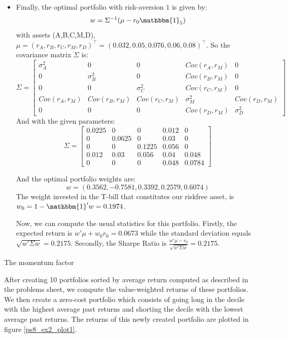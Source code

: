 \documentclass[10pt]{article}
\newenvironment{exercise}[2][Exercise]{\begin{trivlist}
  \item[\hskip \labelsep {\bfseries #1}\hskip \labelsep {\bfseries #2.}]}{\end{trivlist}}
\begin{document}
\begin{itemize}
  In addition, the Information Ratio is the ratio $IR = \frac{\alpha_D}{\sigma_D} =\frac{0.012}{0.08}= 0.15$
  \item[(d)] Finally, the optimal portfolio with risk-aversion $1$ is given by:
  $$ w = \Sigma^{-1}(\mu-r_0\mathbbm{1}_5)$$ with assets (A,B,C,M,D), $\mu = (r_A,r_B,r_C,r_M,r_D)^\top = (0.032,0.05,0.076,0.06,0.08)^\top$. So the covariance matrix $\Sigma$ is: 
  $$ \Sigma = \left[\begin{array}{ccccc}
    \sigma_A^2& 0 &0 &Cov(r_A,r_M)& 0\\
    0&\sigma_B^2 & 0 & Cov(r_B,r_M)&0 \\
    0&0&\sigma_C^2&Cov(r_C,r_M)&0\\
    Cov(r_A,r_M)&Cov(r_B,r_M)&Cov(r_C,r_M)&\sigma_M^2&Cov(r_D,r_M)\\
    0&0&0&Cov(r_D,r_M)&\sigma_D^2
  \end{array}\right]$$ 
  And with the given parameters: 
  $$ \Sigma = \left[\begin{array}{ccccc}
    0.0225 & 0 & 0 & 0.012 &0 \\
    0 & 0.0625 & 0 & 0.03 & 0 \\
    0 & 0 & 0.1225 & 0.056 & 0 \\
    0.012 & 0.03 & 0.056 & 0.04 & 0.048 \\
    0 & 0 & 0 & 0.048 & 0.0784 
  \end{array}\right]$$

  And the optimal portfolio weights are: 
 $$ w = (0.3562, -0.7581, 0.3392, 0.2579, 0.6074)$$
 The weight invested in the T-bill that constitutes our riskfree asset, is $w_0 = 1- \mathbbm{1}'w = 0.1974$.

 Now, we can compute the usual statistics for this portfolio. Firstly, the expected return is $w'\mu + w_0r_0 = 0.0673$ while the standard deviation equals $\sqrt{w'\Sigma w} = 0.2175$. Secondly, the Sharpe Ratio is $ \frac{w'\mu - r_0}{\sqrt{w'\Sigma w}} = 0.2175$.
\end{itemize}
  
\newpage

\begin{exercise}{2}{The momentum factor}
\end{exercise}

After creating 10 portfolios sorted by average return computed as described in
the problems sheet, we compute the value-weighted  returns  of these portfolios.
We then create a zero-cost portfolio which consists of going long in the decile
with the highest average past returns and shorting the decile with the lowest
average past returns. The returns of this newly created portfolio are plotted in
figure \ref{ps8_ex2_plot1}. 
\end{document}
